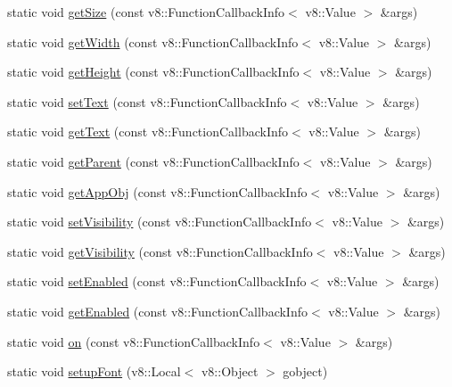\begin{DoxyCompactItemize}
\item 
static void \mbox{\hyperlink{class_rad_j_a_v_1_1_g_u_i_1_1_g_object_a56156b96ff3cf9ea9b904f7747e3201c}{get\+Size}} (const v8\+::\+Function\+Callback\+Info$<$ v8\+::\+Value $>$ \&args)
\item 
static void \mbox{\hyperlink{class_rad_j_a_v_1_1_g_u_i_1_1_g_object_a5f2e06afa00a495e472ecec0243d7d48}{get\+Width}} (const v8\+::\+Function\+Callback\+Info$<$ v8\+::\+Value $>$ \&args)
\item 
static void \mbox{\hyperlink{class_rad_j_a_v_1_1_g_u_i_1_1_g_object_aa3658802914103d789feffe012249a77}{get\+Height}} (const v8\+::\+Function\+Callback\+Info$<$ v8\+::\+Value $>$ \&args)
\item 
static void \mbox{\hyperlink{class_rad_j_a_v_1_1_g_u_i_1_1_g_object_a185460c2e8eb909dec5634ebc5e0350e}{set\+Text}} (const v8\+::\+Function\+Callback\+Info$<$ v8\+::\+Value $>$ \&args)
\item 
static void \mbox{\hyperlink{class_rad_j_a_v_1_1_g_u_i_1_1_g_object_aa01074a9dad24fcb58b26f7db030b188}{get\+Text}} (const v8\+::\+Function\+Callback\+Info$<$ v8\+::\+Value $>$ \&args)
\item 
static void \mbox{\hyperlink{class_rad_j_a_v_1_1_g_u_i_1_1_g_object_abf30d516206611ba3d398af1a60aa888}{get\+Parent}} (const v8\+::\+Function\+Callback\+Info$<$ v8\+::\+Value $>$ \&args)
\item 
static void \mbox{\hyperlink{class_rad_j_a_v_1_1_g_u_i_1_1_g_object_ae90cb7df44cc67bc46a39ed99d79af81}{get\+App\+Obj}} (const v8\+::\+Function\+Callback\+Info$<$ v8\+::\+Value $>$ \&args)
\item 
static void \mbox{\hyperlink{class_rad_j_a_v_1_1_g_u_i_1_1_g_object_ad9df91cdf0ce139230569ad890d67a39}{set\+Visibility}} (const v8\+::\+Function\+Callback\+Info$<$ v8\+::\+Value $>$ \&args)
\item 
static void \mbox{\hyperlink{class_rad_j_a_v_1_1_g_u_i_1_1_g_object_a3f969c2f65af6854c46394de69b47cb3}{get\+Visibility}} (const v8\+::\+Function\+Callback\+Info$<$ v8\+::\+Value $>$ \&args)
\item 
static void \mbox{\hyperlink{class_rad_j_a_v_1_1_g_u_i_1_1_g_object_a00cb3679636dd95e8c87cf4e82c0f23a}{set\+Enabled}} (const v8\+::\+Function\+Callback\+Info$<$ v8\+::\+Value $>$ \&args)
\item 
static void \mbox{\hyperlink{class_rad_j_a_v_1_1_g_u_i_1_1_g_object_a4e6cf5afc68c3f8b247580ea05a179db}{get\+Enabled}} (const v8\+::\+Function\+Callback\+Info$<$ v8\+::\+Value $>$ \&args)
\item 
static void \mbox{\hyperlink{class_rad_j_a_v_1_1_g_u_i_1_1_g_object_aab1d8aa02f21e42363ef59bcc90b89bb}{on}} (const v8\+::\+Function\+Callback\+Info$<$ v8\+::\+Value $>$ \&args)
\item 
static void \mbox{\hyperlink{class_rad_j_a_v_1_1_g_u_i_1_1_g_object_a134b70f53fc2332e98bacd5b65e4c6e0}{setup\+Font}} (v8\+::\+Local$<$ v8\+::\+Object $>$ gobject)
\end{DoxyCompactItemize}


